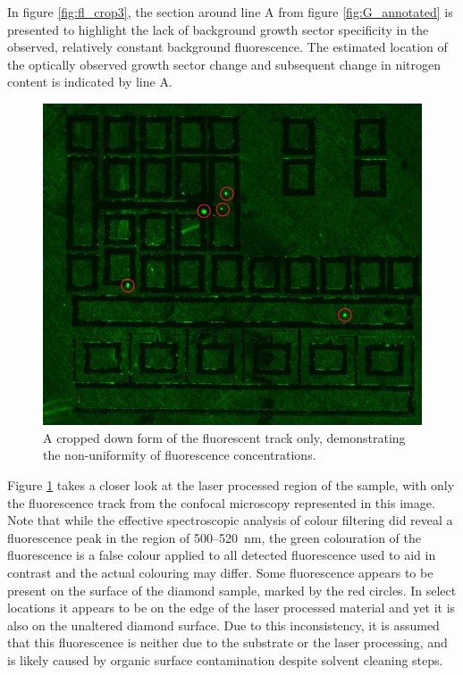 \begin{refsection}
In figure \ref{fig:fl_crop3}, the section around line A from figure \ref{fig:G_annotated} is presented to highlight the lack of background growth sector specificity in the observed, relatively constant background fluorescence. The estimated location of the optically observed growth sector change and subsequent change in nitrogen content is indicated by line A.

\begin{figure}[H]
    \centering
    \includegraphics[width=\linewidth]{Chapter7/Figs/Raster/FL_crop 2_low.jpg}
    \caption{A cropped down form of the fluorescent track only, demonstrating the non-uniformity of fluorescence concentrations.}
    \label{fig:fl_crop2}
\end{figure}

Figure \ref{fig:fl_crop2} takes a closer look at the laser processed region of the sample, with only the fluorescence track from the confocal microscopy represented in this image. Note that while the effective spectroscopic analysis of colour filtering did reveal a fluorescence peak in the region of 500--520~\si{\nano\metre}, the green colouration of the fluorescence is a false colour applied to all detected fluorescence used to aid in contrast and the actual colouring may differ. Some fluorescence appears to be present on the surface of the diamond sample, marked by the red circles. In select locations it appears to be on the edge of the laser processed material and yet it is also on the unaltered diamond surface. Due to this inconsistency, it is assumed that this fluorescence is neither due to the substrate or the laser processing, and is likely caused by organic surface contamination despite solvent cleaning steps.


\end{refsection}
